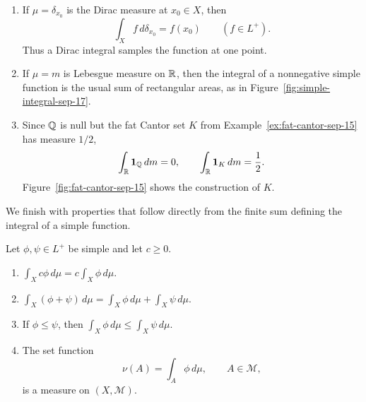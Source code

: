 \begin{example}
  \begin{enumerate}[label=(\roman*)]
    \item If $\mu=\delta_{x_0}$ is the Dirac measure at $x_0\in X$,
      then
      \[
        \int_X f\,d\delta_{x_0}=f(x_0)
        \qquad(f\in L^+).
      \]
      Thus a Dirac integral samples the function at one point.
    \item If $\mu=m$ is Lebesgue measure on $\mathbb{R}$, then the integral
      of a nonnegative simple function is the usual sum of rectangular
      areas, as in Figure~\ref{fig:simple-integral-sep-17}.
    \item Since $\mathbb{Q}$ is null but the fat Cantor set $K$ from
      Example~\ref{ex:fat-cantor-sep-15} has measure $1/2$,
      \[
        \int_{\mathbb{R}}\mathbf 1_{\mathbb{Q}}\,dm=0,
        \qquad
        \int_{\mathbb{R}}\mathbf 1_K\,dm=\frac12.
      \]
      Figure~\ref{fig:fat-cantor-sep-15} shows the construction of $K$.
  \end{enumerate}
\end{example}

We finish with properties that follow directly from the finite sum
defining the integral of a simple function.

\begin{proposition}
  \label{prop:simple-integral-properties-sep-17}
  Let $\phi,\psi\in L^+$ be simple and let $c\geq0$.
  \begin{enumerate}[label=(\alph*)]
    \item $\displaystyle\int_X c\phi\,d\mu
      =c\int_X\phi\,d\mu$.
    \item $\displaystyle\int_X(\phi+\psi)\,d\mu
      =\int_X\phi\,d\mu+\int_X\psi\,d\mu$.
    \item If $\phi\leq\psi$, then
      $\displaystyle\int_X\phi\,d\mu
      \leq\int_X\psi\,d\mu$.
    \item The set function
      \[
        \nu(A)=\int_A\phi\,d\mu,
        \qquad A\in\mathcal M,
      \]
      is a measure on $(X,\mathcal M)$.
  \end{enumerate}
\end{proposition}

